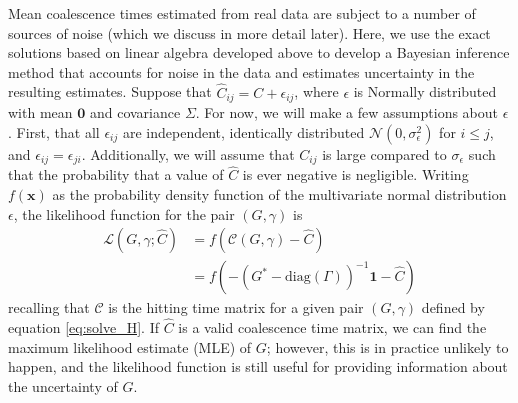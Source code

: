 \documentclass{article}
\begin{document}
Mean coalescence times estimated from real data are subject to a number of sources of noise
(which we discuss in more detail later).
Here, we use
the exact solutions based on linear algebra developed above
to develop a Bayesian inference method that accounts for noise in the data
and estimates uncertainty in the resulting estimates.
Suppose that $\hat{C}_{ij} = C + \epsilon_{ij}$,
where $\epsilon$ is Normally distributed
with mean $\mathbf{0}$ and covariance $\Sigma$.
For now, we will make a few assumptions about $\epsilon$.
First, that all $\epsilon_{ij}$ are independent, identically distributed $\mathcal{N}(0,\sigma_{\epsilon}^2)$
for $i \leq j$, and $\epsilon_{ij} = \epsilon_{ji}$.
Additionally, we will assume that $C_{ij}$ is large compared to $\sigma_{\epsilon}$
such that the probability that a value of $\hat{C}$ is ever negative is negligible.
Writing $f(\mathbf{x})$ as the probability density function of 
the multivariate normal distribution $\epsilon$,
the likelihood function for the pair $(G,\gamma)$ is
\begin{align*}
\mathcal{L}(G,\gamma;\hat{C}) &= f(\mathcal{C}(G,\gamma) - \hat{C}) \\
			      &= f(-(G^*-\text{diag$(\Gamma)$})^{-1} \mathbf{1} - \hat{C})
\end{align*}
recalling that $\mathcal{C}$ is the hitting time matrix for a given pair $(G,\gamma)$
defined by equation \ref{eq:solve_H}. 
If $\hat{C}$ is a valid coalescence time matrix,
we can find the maximum likelihood estimate (MLE) of $G$;
however, this is in practice unlikely to happen, 
and the likelihood function is still useful 
for providing information about the uncertainty of $G$.
\end{document}
